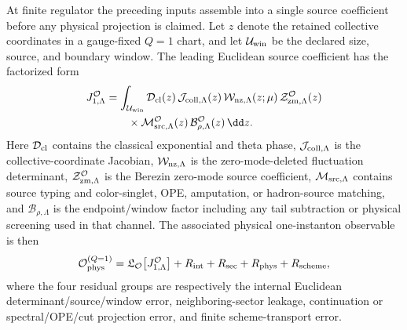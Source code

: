 \begin{controlledapproximation}
\label{ca:one-instanton-amplitude-skeleton}
At finite regulator the preceding inputs assemble into a single source
coefficient before any physical projection is claimed.  Let \(z\) denote the
retained collective coordinates in a
gauge-fixed \(Q=1\) chart, and let \(\mathcal U_{\rm win}\) be the declared
size, source, and boundary window.  The leading Euclidean source coefficient
has the factorized form
\begin{equation}
\begin{aligned}
  J_{1,\Lambda}^{\mathcal O}
  &=
  \int_{\mathcal U_{\rm win}}
  \mathcal D_{\rm cl}(z)\,
  \mathcal J_{\rm coll,\Lambda}(z)\,
  \mathcal W_{\rm nz,\Lambda}(z;\mu)\,
  \mathcal Z_{\rm zm,\Lambda}^{\mathcal O}(z)       \\
  &\qquad{}\times
  \mathcal M_{\rm src,\Lambda}^{\mathcal O}(z)\,
  \mathcal B_{\rho,\Lambda}^{\mathcal O}(z)\,
  \dd z .
\end{aligned}
  \label{eq:one-instanton-amplitude-skeleton}
\end{equation}
Here \(\mathcal D_{\rm cl}\) contains the classical exponential and theta
phase, \(\mathcal J_{\rm coll,\Lambda}\) is the collective-coordinate
Jacobian, \(\mathcal W_{\rm nz,\Lambda}\) is the zero-mode-deleted
fluctuation determinant, \(\mathcal Z_{\rm zm,\Lambda}^{\mathcal O}\)
is the Berezin zero-mode source coefficient, \(\mathcal M_{\rm src,\Lambda}\)
contains source typing and color-singlet, OPE, amputation, or hadron-source
matching, and \(\mathcal B_{\rho,\Lambda}\) is the endpoint/window factor
including any tail subtraction or physical screening used in that channel.
The associated physical one-instanton observable is then
\begin{equation}
  \mathcal O_{\rm phys}^{(Q=1)}
  =
  \mathfrak L_{\mathcal O}\!\left[J_{1,\Lambda}^{\mathcal O}\right]
  +
  R_{\rm int}+R_{\rm sec}+R_{\rm phys}+R_{\rm scheme},
  \label{eq:one-instanton-amplitude-skeleton-physical}
\end{equation}
where the four residual groups are respectively the internal Euclidean
determinant/source/window error, neighboring-sector leakage, continuation or
spectral/OPE/cut projection error, and finite scheme-transport error.


\end{controlledapproximation}

